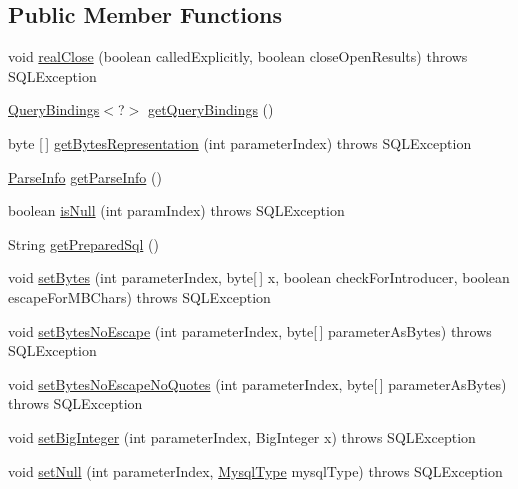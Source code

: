 \subsection*{Public Member Functions}
\begin{DoxyCompactItemize}
\item 
void \mbox{\hyperlink{interfacecom_1_1mysql_1_1cj_1_1jdbc_1_1_jdbc_prepared_statement_a141eeee85d7c5f0b1a3cb6efbe2b052a}{real\+Close}} (boolean called\+Explicitly, boolean close\+Open\+Results)  throws S\+Q\+L\+Exception
\item 
\mbox{\hyperlink{interfacecom_1_1mysql_1_1cj_1_1_query_bindings}{Query\+Bindings}}$<$?$>$ \mbox{\hyperlink{interfacecom_1_1mysql_1_1cj_1_1jdbc_1_1_jdbc_prepared_statement_a1d95958c32c8174c267e3d91e7371a13}{get\+Query\+Bindings}} ()
\item 
byte \mbox{[}$\,$\mbox{]} \mbox{\hyperlink{interfacecom_1_1mysql_1_1cj_1_1jdbc_1_1_jdbc_prepared_statement_ae8f9f48f17aec65c48330d444f0a3a5f}{get\+Bytes\+Representation}} (int parameter\+Index)  throws S\+Q\+L\+Exception
\item 
\mbox{\hyperlink{classcom_1_1mysql_1_1cj_1_1_parse_info}{Parse\+Info}} \mbox{\hyperlink{interfacecom_1_1mysql_1_1cj_1_1jdbc_1_1_jdbc_prepared_statement_ac7a61028280256f1c0360f7cdfefa0e7}{get\+Parse\+Info}} ()
\item 
boolean \mbox{\hyperlink{interfacecom_1_1mysql_1_1cj_1_1jdbc_1_1_jdbc_prepared_statement_afdd7b92fa3a45b8643a7f992807b487a}{is\+Null}} (int param\+Index)  throws S\+Q\+L\+Exception
\item 
String \mbox{\hyperlink{interfacecom_1_1mysql_1_1cj_1_1jdbc_1_1_jdbc_prepared_statement_a20618e9a216f90d8366fd7e931783dda}{get\+Prepared\+Sql}} ()
\item 
void \mbox{\hyperlink{interfacecom_1_1mysql_1_1cj_1_1jdbc_1_1_jdbc_prepared_statement_ab355e6fcc10a4fae67e0425b76bc218f}{set\+Bytes}} (int parameter\+Index, byte\mbox{[}$\,$\mbox{]} x, boolean check\+For\+Introducer, boolean escape\+For\+M\+B\+Chars)  throws S\+Q\+L\+Exception
\item 
void \mbox{\hyperlink{interfacecom_1_1mysql_1_1cj_1_1jdbc_1_1_jdbc_prepared_statement_a46f072b1d5f3463b8371262dc5ed9ead}{set\+Bytes\+No\+Escape}} (int parameter\+Index, byte\mbox{[}$\,$\mbox{]} parameter\+As\+Bytes)  throws S\+Q\+L\+Exception
\item 
void \mbox{\hyperlink{interfacecom_1_1mysql_1_1cj_1_1jdbc_1_1_jdbc_prepared_statement_aac822ef5e0e6cb44d83c2b0afb4078fe}{set\+Bytes\+No\+Escape\+No\+Quotes}} (int parameter\+Index, byte\mbox{[}$\,$\mbox{]} parameter\+As\+Bytes)  throws S\+Q\+L\+Exception
\item 
void \mbox{\hyperlink{interfacecom_1_1mysql_1_1cj_1_1jdbc_1_1_jdbc_prepared_statement_a6af501f3841da06821f86578cc154116}{set\+Big\+Integer}} (int parameter\+Index, Big\+Integer x)  throws S\+Q\+L\+Exception
\item 
void \mbox{\hyperlink{interfacecom_1_1mysql_1_1cj_1_1jdbc_1_1_jdbc_prepared_statement_a3a6d8662a3372f19ead94698c2cf3ed1}{set\+Null}} (int parameter\+Index, \mbox{\hyperlink{enumcom_1_1mysql_1_1cj_1_1_mysql_type}{Mysql\+Type}} mysql\+Type)  throws S\+Q\+L\+Exception
\end{DoxyCompactItemize}
